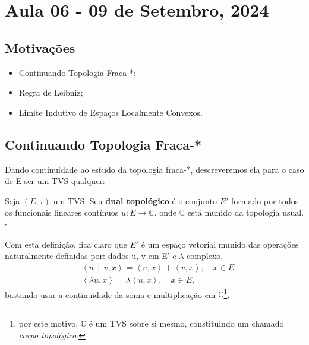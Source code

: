 \documentclass[../distribution_theory_notes.tex]{subfiles}
\begin{document}
\section{Aula 06 - 09 de Setembro, 2024}
\subsection{Motivações}
\begin{itemize}
	\item Continuando Topologia Fraca-*;
	\item Regra de Leibniz;
	\item Limite Indutivo de Espaços Localmente Convexos.
\end{itemize}
\subsection{Continuando Topologia Fraca-*}
Dando continuidade ao estudo da topologia fraca-*, descreveremos ela para o caso de E ser um TVS qualquer:

\begin{def*}
	Seja \((E, \tau )\) um TVS. Seu \textbf{dual topológico} é o conjunto \(E'\) formado por todos os funcionais lineares contínuos \(u:E\rightarrow \mathbb{C}\), onde \(\mathbb{C}\) está munido da topologia usual. \(\square\)
\end{def*}

Com esta definição, fica claro que \(E'\) é um espaço vetorial munido das operações naturalmente definidas por: dados u, v em E' e \(\lambda \) complexo,
\begin{align*}
	 & \left< u+v, x \right> = \left< u, x \right> + \left< v, x \right>,\quad x\in E \\
	 & \left< \lambda u, x \right> = \lambda \left< u, x \right>,\quad x\in E,
\end{align*}
bastando usar a continuidade da soma e multiplicação em \(\mathbb{C}\)\footnote{por este motivo, \(\mathbb{C}\) é um TVS sobre si mesmo, constituindo um chamado \textit{corpo topológico}.}.
\end{document}
